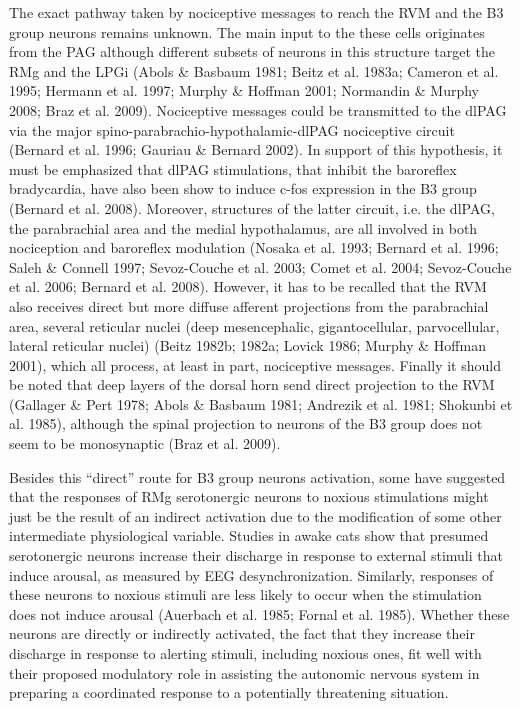 \documentclass[a4paper,12pt,twoside]{report}
\begin{document}
The exact pathway taken by nociceptive messages to reach the RVM and the B3 group neurons remains unknown. The main input to the these cells originates from the PAG although different subsets of neurons in this structure target the RMg and the LPGi (Abols \& Basbaum 1981; Beitz et al. 1983a; Cameron et al. 1995; Hermann et al. 1997; Murphy \& Hoffman 2001; Normandin \& Murphy 2008; Braz et al. 2009). Nociceptive messages could be transmitted to the dlPAG via the major spino-parabrachio-hypothalamic-dlPAG nociceptive circuit (Bernard et al. 1996; Gauriau \& Bernard 2002). In support of this hypothesis, it must be emphasized that dlPAG stimulations, that inhibit the baroreflex bradycardia, have also been show to induce c-fos expression in the B3 group (Bernard et al. 2008). Moreover, structures of the latter circuit, i.e. the dlPAG, the parabrachial area and the medial hypothalamus, are all involved in both nociception and baroreflex modulation (Nosaka et al. 1993; Bernard et al. 1996; Saleh \& Connell 1997; Sevoz-Couche et al. 2003; Comet et al. 2004; Sevoz-Couche et al. 2006; Bernard et al. 2008). However, it has to be recalled that the RVM also receives direct but more diffuse afferent projections from the parabrachial area, several reticular nuclei (deep mesencephalic, gigantocellular, parvocellular, lateral reticular nuclei) (Beitz 1982b; 1982a; Lovick 1986; Murphy \& Hoffman 2001), which all process, at least in part, nociceptive messages. Finally it should be noted that deep layers of the dorsal horn send direct projection to the RVM (Gallager \& Pert 1978; Abols \& Basbaum 1981; Andrezik et al. 1981; Shokunbi et al. 1985), although the spinal projection to neurons of the B3 group does not seem to be monosynaptic (Braz et al. 2009). 

Besides this “direct” route for B3 group neurons activation, some have suggested that the responses of RMg serotonergic neurons to noxious stimulations might just be the result of an indirect activation due to the modification of some other intermediate physiological variable. Studies in awake cats show that presumed serotonergic neurons increase their discharge in response to external stimuli that induce arousal, as measured by EEG desynchronization. Similarly, responses of these neurons to noxious stimuli are less likely to occur when the stimulation does not induce arousal (Auerbach et al. 1985; Fornal et al. 1985). Whether these neurons are directly or indirectly activated, the fact that they increase their discharge in response to alerting stimuli, including noxious ones, fit well with their proposed modulatory role in assisting the autonomic nervous system in preparing a coordinated response to a potentially threatening situation.
\end{document}
